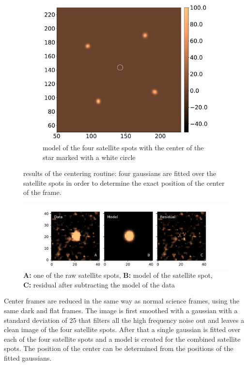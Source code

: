 \documentclass[twoside,single,12pt]{lion-msc}
\begin{document}
\begin{figure}[!t]
\begin{subfigure}{.48\textwidth}
  \includegraphics[width=1\linewidth]{centermodel}%
  \caption{model of the four satellite spots with the center of the star marked with a white circle}
  \label{fig:centermodel}
\end{subfigure}
\caption{results of the centering routine: four gaussians are fitted over the satellite spots in order to determine the exact position of the center of the frame.}
\end{figure}

\begin{figure}[!b]
\centering
\vspace{-0.4cm}
\includegraphics[width = \textwidth]{resultmodel}
\caption{\textbf{A:} one of the raw satellite spots, \textbf{B:} model of the satellite spot,\\ \textbf{C:} residual after subtracting the model of the data} 
\label{fig:resultmodel}
\end{figure}
\bigskip
Center frames are reduced in the same way as normal science frames, using the same dark and flat frames. The image is first smoothed with a gaussian with a standard deviation of 25 that filters all the high frequency noise out and leaves a clean image of the four satellite spots. After that a single gaussian is fitted over each of the four satellite spots and a model is created for the combined satellite spots. The position of the center can be determined from the positions of the fitted gaussians. 
\bigskip
\end{document}
